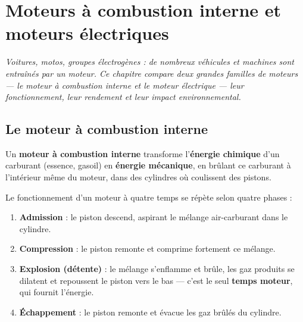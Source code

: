 \chapter{Moteurs à combustion interne et moteurs électriques}

\noindent\textit{Voitures, motos, groupes électrogènes : de nombreux véhicules et
machines sont entraînés par un moteur. Ce chapitre compare deux grandes familles de
moteurs — le moteur à combustion interne et le moteur électrique — leur fonctionnement,
leur rendement et leur impact environnemental.}
\vspace{8pt}

\connecteBanner

\section{Le moteur à combustion interne}

\begin{definition}
Un \textbf{moteur à combustion interne} transforme l'\textbf{énergie chimique} d'un
carburant (essence, gasoil) en \textbf{énergie mécanique}, en brûlant ce carburant à
l'intérieur même du moteur, dans des cylindres où coulissent des pistons.
\end{definition}

\begin{propriete}
Le fonctionnement d'un moteur à quatre temps se répète selon quatre phases :
\begin{enumerate}
\item \textbf{Admission} : le piston descend, aspirant le mélange air-carburant dans le
cylindre.
\item \textbf{Compression} : le piston remonte et comprime fortement ce mélange.
\item \textbf{Explosion (détente)} : le mélange s'enflamme et brûle, les gaz produits se
dilatent et repoussent le piston vers le bas — c'est le seul \textbf{temps moteur}, qui
fournit l'énergie.
\item \textbf{Échappement} : le piston remonte et évacue les gaz brûlés du cylindre.
\end{enumerate}
\end{propriete}

\begin{illus}
\end{illus}

